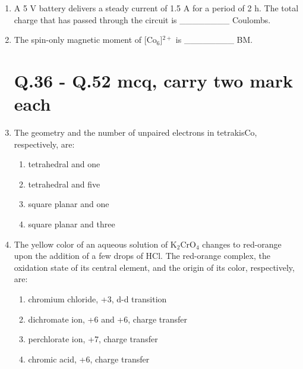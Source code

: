 \documentclass[journal,12pt,onecolumn]{IEEEtran}
\begin{document}
\begin{enumerate}
    \item A 5 V battery delivers a steady current of 1.5 A for a period of 2 h. The total charge that has passed through the circuit is \_\_\_\_\_\_\_\_ Coulombs.
    \hfill{}

    \item The spin-only magnetic moment of [Co$_6$]$^{2+}$  is \_\_\_\_\_\_\_\_ BM.
    \hfill{}
\section*{Q.36 - Q.52 mcq, carry two mark each}

    \item The geometry and the number of unpaired electrons in tetrakisCo, respectively, are:
    \begin{multicols}{2}
    \begin{enumerate}
        \item tetrahedral and one
        \item tetrahedral and five
        \item square planar and one
        \item square planar and three
    \end{enumerate}
    \end{multicols}
    \hfill{}

    \item The yellow color of an aqueous solution of K$_2$CrO$_4$ changes to red-orange upon the addition of a few drops of HCl. The red-orange complex, the oxidation state of its central element, and the origin of its color, respectively, are:
    \begin{multicols}{2}
    \begin{enumerate}
        \item chromium chloride, +3, d-d transition
        \item dichromate ion, +6 and +6, charge transfer
        \item perchlorate ion, +7, charge transfer
        \item chromic acid, +6, charge transfer
    \end{enumerate}
    \end{multicols}
    \hfill{}


\end{enumerate}
\end{document}
